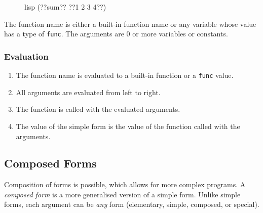 \documentclass[a4paper, 12pt]{article}
\begin{document}
\begin{figure}[htp]
    \centering
    \begin{cminted}[autogobble=true, escapeinside=??]{lisp}
        (??sum?? ??1 2 3 4??)
    \end{cminted}
    \captionsetup[figure]{font=small, skip=2em}
\end{figure}

The function name is either a built-in function name or any variable whose value has a type of \texttt{func}. The arguments are 0 or more variables or constants.

\subsubsection{Evaluation}
\begin{enumerate}
    \item The function name is evaluated to a built-in function or a \texttt{func} value.
    \item All arguments are evaluated from left to right.
    \item The function is called with the evaluated arguments.
    \item The value of the simple form is the value of the function called with the arguments.
\end{enumerate}

\subsection{Composed Forms} \label{subsec:composedforms}
Composition of forms is possible, which allows for more complex programs. A \textit{composed form} is a more generalised version of a simple form. Unlike simple forms, each argument can be \textit{any} form (elementary, simple, composed, or special).
\end{document}
